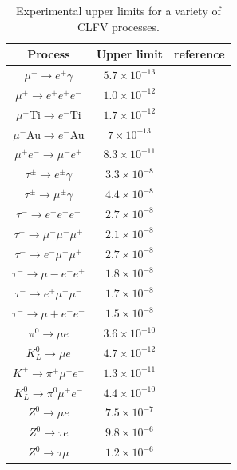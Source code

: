 \documentclass[12pt,a4paper,openright, oneside, titlepage]{book} %
\begin{document}
\begin{table}[!h]
\centering
\begin{tabular}{c|c|c}
\hline
Process & Upper limit & reference\\
\hline
\hline
$\mu^+\rightarrow e^+\gamma$ & $5.7\times 10^{-13}$ & \cite{MEG}\\
$\mu^+\rightarrow e^+e^+e^-$ & $1.0\times 10^{-12}$ & \cite{SINDRUM}\\
$\mu^-$Ti$\rightarrow e^-$Ti  & $1.7\times 10^{-12}$ & \cite{SINDRUM}\\
$\mu^-$Au$\rightarrow e^-$Au  & $7\times 10^{-13}$   & \cite{Bertl}\\
$\mu^+e^-\rightarrow \mu^-e^+$ & $8.3\times 10^{-11}$ & \cite{Willmann}\\
$\tau^\pm\rightarrow e^\pm\gamma$ & $3.3\times 10^{-8}$ & \cite{Aubert}\\
$\tau^\pm\rightarrow \mu^\pm\gamma$ & $4.4\times 10^{-8}$ & \cite{Aubert}\\
$\tau^-\rightarrow e^-e^-e^+$ & $2.7\times 10^{-8}$ & \cite{Hayasaka}\\
$\tau^-\rightarrow \mu^-\mu^-\mu^+$ & $2.1\times 10^{-8}$ & \cite{Hayasaka}\\
$\tau^-\rightarrow e^-\mu^-\mu^+$ & $2.7\times 10^{-8}$ & \cite{Hayasaka}\\
$\tau^-\rightarrow \mu-e^-e^+$ & $1.8\times 10^{-8}$ & \cite{Hayasaka}\\
$\tau^-\rightarrow e^+\mu^-\mu^-$ & $1.7\times 10^{-8}$ & \cite{Hayasaka}\\
$\tau^-\rightarrow \mu+e^-e^-$ & $1.5\times 10^{-8}$ & \cite{Hayasaka}\\
$\pi^0\rightarrow \mu e$ & $3.6\times 10^{-10}$ & \cite{Abouzaid}\\
$K^0_L\rightarrow \mu e$ & $4.7\times 10^{-12}$ & \cite{Ambrose}\\
$K^+\rightarrow \pi^+\mu^+e^-$ & $1.3\times 10^{-11}$ & \cite{Sher}\\
$K^0_L\rightarrow \pi^0\mu^+e^-$ & $4.4\times 10^{-10}$ & \cite{Abouzaid}\\
$Z^0\rightarrow \mu e$ & $7.5\times10^{-7}$& \cite{Aad}\\
$Z^0\rightarrow \tau e$ & $9.8\times10^{-6}$& \cite{Akers} \\
$Z^0\rightarrow \tau \mu$ & $1.2\times10^{-6}$& \cite{Akers}\\
\hline
\end{tabular}
\caption{Experimental upper limits for a variety of CLFV processes.}
\label{T_CLFV}
\end{table}
\end{document}
